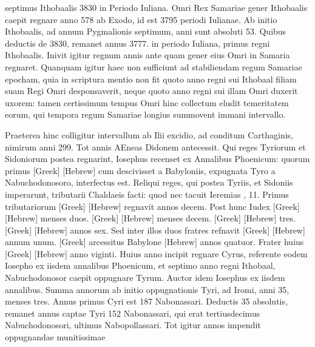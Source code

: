 septimus Ithobaalis 3830 in Periodo Iuliana.
Omri Rex Samariae
gener Ithobaalis caepit regnare anno 578 ab Exodo, id
est 3795 periodi Iulianae.
Ab initio Ithobaalis, ad annum Pygmalionis
septimum, anni sunt absoluti 53.
Quibus deductis de
3830, remanet annus 3777. in periodo Iuliana, primus regni
Ithobaalis.
Inivit igitur regnum  annis ante quam gener eius
Omri in Samaria regnaret.
Quanquam igitur haec non sufficiunt
ad stabiliendam regum Samariae epocham, quia in scriptura mentio
non fit quoto anno regni sui Ithobaal filiam suam Regi Omri desponsaverit,
neque quoto anno regni sui illam Omri duxerit uxorem:
tamen certissimum tempus Omri hinc collectum eludit temeritatem
eorum, qui tempora regum Samariae longius summovent
immani intervallo.

Praeterea hinc colligitur intervallum
ab Ilii excidio, ad conditum Carthaginis, nimirum anni 299.
Tot annis AEneas Didonem antecessit.
Qui reges Tyriorum et Sidoniorum
postea regnarint, Iosephus recenset ex Annalibus Phoenicum:
quorum primus \textgreek{[Greek]} \texthebrew{[Hebrew]}
 cum descivisset a Babyloniis,
expugnata Tyro a Nabuchodonosoro, interfectus est.
Reliqui reges, qui postea Tyriis, et Sidoniis imperarunt, tributarii
Chaldaeis facti: quod nec tacuit Ieremias , 11.
Primus
tributariorum \textgreek{[Greek]} \texthebrew{[Hebrew]} regnavit annos decem.
Post hunc Iudex
\textgreek{[Greek]} \texthebrew{[Hebrew]} menses duos.
\textgreek{[Greek]} \texthebrew{[Hebrew]} menses decem.
\textgreek{[Greek]} \texthebrew{[Hebrew]} tres.
\textgreek{[Greek]} \texthebrew{[Hebrew]}
annos sex.
Sed inter illos duos fratres refnavit
 \textgreek{[Greek]} \texthebrew{[Hebrew]}
annum unum.
\textgreek{[Greek]} arcessitus Babylone
 \texthebrew{[Hebrew]} annos quatuor.
Frater huius \textgreek{[Greek]} \texthebrew{[Hebrew]} anno viginti.
Huius anno 
incipit regnare Cyrus, referente eodem Iosepho ex iisdem annalibus
Phoenicum, et septimo anno regni Ithobaal, Nabuchodonosor
caepit oppugnare Tyrum.
Auctor idem Iosephus ex iisdem
annalibus.
Summa annorum ab initio oppugnationis Tyri, ad
 Iromi, anni 35, menses tres.
Annus primus Cyri est 187 Nabonassari.
Deductis 35 absolutis, remanet annus captae Tyri 152
Nabonassari, qui erat tertiusdecimus Nabuchodonosori, ultimus
Nabopollassari.
Tot igitur annos impendit oppugnandae munitissimae
